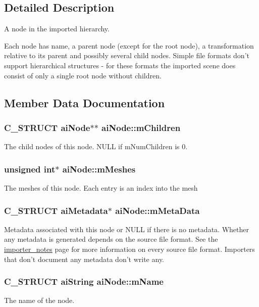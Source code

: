 \subsection{Detailed Description}
A node in the imported hierarchy.

Each node has name, a parent node (except for the root node), a transformation relative to its parent and possibly several child nodes. Simple file formats don't support hierarchical structures -\/ for these formats the imported scene does consist of only a single root node without children. 

\subsection{Member Data Documentation}
\hypertarget{structai_node_ac700679f0d4971f124e8444f68057291}{
\subsubsection[{m\+Children}]{\setlength{\rightskip}{0pt plus 5cm}C\+\_\+\+S\+T\+R\+U\+C\+T {\bf ai\+Node}$\ast$$\ast$ ai\+Node\+::m\+Children}}\label{structai_node_ac700679f0d4971f124e8444f68057291}
The child nodes of this node. N\+U\+L\+L if m\+Num\+Children is 0. \hypertarget{structai_node_acd1706d6508b31916c18e39b7085ca63}{
\subsubsection[{m\+Meshes}]{\setlength{\rightskip}{0pt plus 5cm}unsigned int$\ast$ ai\+Node\+::m\+Meshes}}\label{structai_node_acd1706d6508b31916c18e39b7085ca63}
The meshes of this node. Each entry is an index into the mesh \hypertarget{structai_node_a111b5a6cbc5dccde0cf2a17a6e5c3b67}{
\subsubsection[{m\+Meta\+Data}]{\setlength{\rightskip}{0pt plus 5cm}C\+\_\+\+S\+T\+R\+U\+C\+T {\bf ai\+Metadata}$\ast$ ai\+Node\+::m\+Meta\+Data}}\label{structai_node_a111b5a6cbc5dccde0cf2a17a6e5c3b67}
Metadata associated with this node or N\+U\+L\+L if there is no metadata. Whether any metadata is generated depends on the source file format. See the \hyperlink{importer_notes}{importer\+\_\+notes} page for more information on every source file format. Importers that don't document any metadata don't write any. \hypertarget{structai_node_afa528a7e43e15d92a920229b1ff094f6}{
\subsubsection[{m\+Name}]{\setlength{\rightskip}{0pt plus 5cm}C\+\_\+\+S\+T\+R\+U\+C\+T {\bf ai\+String} ai\+Node\+::m\+Name}}\label{structai_node_afa528a7e43e15d92a920229b1ff094f6}
The name of the node.

